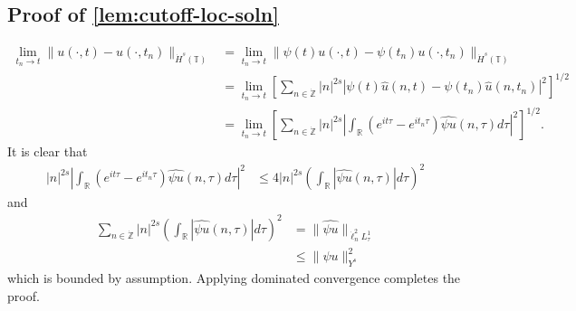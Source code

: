 \documentclass[12pt,reqno]{amsart}
\numberwithin{equation}{section}  %
\numberwithin{figure}{section}
\newcommand{\rr}{\mathbb{R}}
\newcommand{\zz}{\mathbb{Z}}
\newcommand{\ci}{\mathbb{T}}
\newcommand{\zzdot}{\dot{\zz}}
\newcommand{\wh}{\widehat}
\theoremstyle{plain}
\theoremstyle{definition}
\theoremstyle{remark}
\begin{document}
\section{}
%
\subsection{Proof of \autoref{lem:cutoff-loc-soln}}
%
%
\begin{equation*}
	\begin{split}
		\lim_{t_{n} \to t} \|u(\cdot, t) - u(\cdot, t_{n})\|_{\dot{H}^s(\ci)} 
		& = \lim_{t_{n} \to t} \|\psi(t) u(\cdot, t) - \psi(t_n) u(\cdot,
		t_{n})\|_{\dot{H}^s(\ci)} 
		\\
		& = \lim_{t_n \to t} \left[ \sum_{n \in \zzdot}| n |
		^{2s} | \psi(t)  \wh{u}(n, t) - \psi(t_n) \wh{ u}(n, t_n) |^2 \right]^{1/2}
		\\
		& = \lim_{t_n \to t} \left[ \sum_{n \in \zzdot} | n |^{2s} | \int_{\rr} (e^{it \tau} - e^{it_{n} \tau}) \wh{\psi u}(n,
		\tau) d \tau |^2 \right]^{1/2}.
	\end{split}
\end{equation*}
		It is clear that
		\begin{equation*}
			\begin{split}
				| n |
				^{2s} | \int_{\rr} (e^{it \tau} - e^{it_{n}\tau}) \wh{\psi u}(n, \tau) d \tau |^2 
		& \le 4  | n |^{2s} \left ( \int_{\rr} |\wh{\psi u}(n, \tau)| d \tau
		\right )^2 
	\end{split}
\end{equation*}
and 
%
%
\begin{equation*}
	\begin{split}
 \sum_{n \in \zzdot} | n |^{2s} \left ( \int_{\rr} |\wh{\psi u}(n, \tau)| d \tau
		\right ) ^2 
		& = \|\wh{\psi u}\|_{\dot{\ell}_n^2 L_\tau^1}
		\\
		& \le \|\psi u \|_{Y^s}^2 
	\end{split}
\end{equation*}
which is bounded by assumption.
Applying dominated convergence completes the proof. \qquad \qedsymbol
%
%
\end{document}
